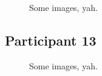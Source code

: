 \lipsum[1]

\clearpage

\begin{figure}[h]
	\caption{Some images, yah.}
\end{figure}

\lipsum[1]


\clearpage

\subsection{Participant 13}

\begin{figure}[h]
	\caption{Some images, yah.}
\end{figure}


